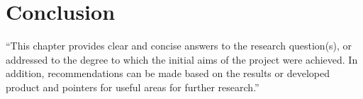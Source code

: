 \chapter{Conclusion}
\label{ch:conclusion}

\enquote{This chapter provides clear and concise answers to the research question(s), or addressed to the
degree to which the initial aims of the project were achieved. In addition, recommendations can
be made based on the results or developed product and pointers for useful areas for further
research.} \citep{handbook}